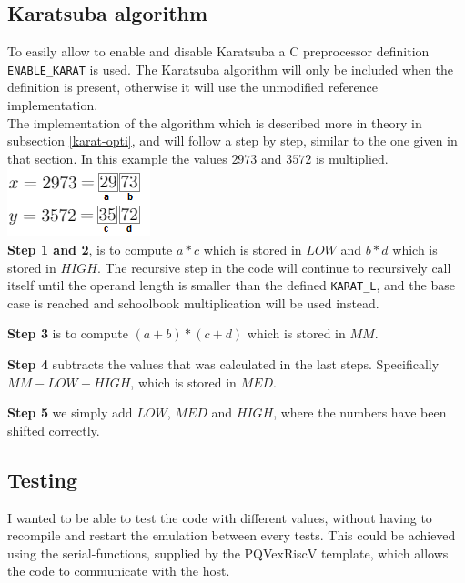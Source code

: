 \subsection{Karatsuba algorithm}
To easily allow to enable and disable Karatsuba a C preprocessor definition \texttt{ENABLE\_KARAT} is used. The Karatsuba algorithm will only be included when the definition is present, otherwise it will use the unmodified reference implementation.\medskip
\\
The implementation of the algorithm which is described more in theory in subsection \ref{karat-opti}, and will follow a step by step, similar to the one given in that section. In this example the values $2973$ and $3572$ is multiplied. \\
\includegraphics{report/images/karat-split.png}\\
\textbf{Step 1 and 2}, is to compute $a * c$ which is stored in $LOW$ and $b * d$ which is stored in $HIGH$. The recursive step in the code will continue to recursively call itself until the operand length is smaller than the defined \texttt{KARAT\_L}, and the base case is reached and schoolbook multiplication will be used instead.

\medskip
\textbf{Step 3} is to compute $(a + b) * (c + d)$ which is stored in $MM$.

\medskip
\textbf{Step 4} subtracts the values that was calculated in the last steps. Specifically $MM - LOW - HIGH$, which is stored in $MED$.

\medskip
\textbf{Step 5} we simply add $LOW$, $MED$ and $HIGH$, where the numbers have been shifted correctly.

\pagebreak
\subsection{Testing}
\label{sub-testing}
I wanted to be able to test the code with different values, without having to recompile and restart the emulation between every tests. This could be achieved using the serial-functions, supplied by the PQVexRiscV\cite{PQVexRiscV} template, which allows the code to communicate with the host.
